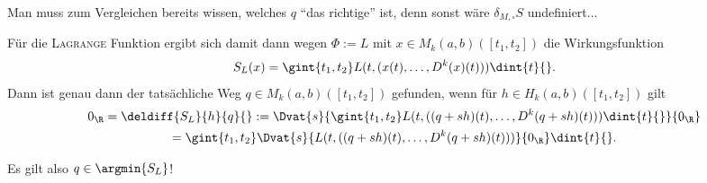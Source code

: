 \documentclass[../WiSe22ANA3.tex]{subfiles}
\begin{document}
 	 	\begin{verm}
	 		Man muss zum Vergleichen bereits wissen, welches $q$ \enquote{das richtige} ist, denn sonst wäre $\delta_{M,\square} S$ undefiniert...  
 	 	\end{verm}
	 	Für die \textsc{Lagrange} Funktion ergibt sich damit dann wegen $\Phi:=L$ mit $x\in M_k(a,b)([t_1,t_2])$ die Wirkungsfunktion 
	 	\begin{align*}
	 		S_L(x)=\gint{t_1,t_2}L(t,(x(t),\dots,D^k(x)(t)))\dint{t}{}.  
	 	\end{align*}
		Dann ist genau dann der tatsächliche Weg $q\in M_k(a,b)([t_1,t_2])$ gefunden, wenn für $h\in H_k(a,b)([t_1,t_2])$ gilt 
	 	\begin{multline*}
	 		0_\R=\deldiff{S_L}{h}{q}{}:=\Dvat{s}{\gint{t_1,t_2}L(t,((q+sh)(t),\dots,D^k(q+sh)(t)))\dint{t}{}}{0_\R} \\
			=\gint{t_1,t_2}\Dvat{s}{L(t,((q+sh)(t),\dots,D^k(q+sh)(t)))}{0_\R}\dint{t}{}. 
	 	\end{multline*}
	 	\begin{Bemerkung}
	 		Es gilt also $q\in\argmin{S_L}$! 
	 	\end{Bemerkung}
	 	
\end{document}
